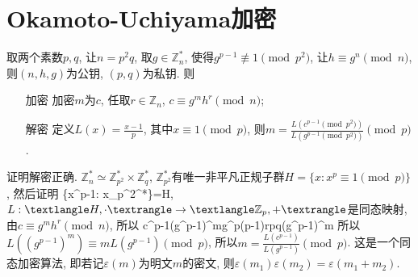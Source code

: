 \section{Okamoto-Uchiyama加密}
取两个素数$p,q$, 让$n=p^2q$, 取$g\in\mathbb{Z}_{n}^{*}$, 使得$g^{p-1}\not\equiv 1\pmod{p^2}$, 让$h\equiv g^n \pmod{n}$, 则$(n,h,g)$为公钥, $(p,q)$为私钥. 则
\begin{itemize}
 \item[加密] 加密$m$为$c$, 任取$r\in\mathbb{Z}_n$, $c\equiv g^mh^r\pmod{n}$;
 \item[解密] 定义$L(x)=\frac{x-1}{p}$, 其中$x\equiv 1\pmod{p}$, 则$m=\frac{L(c^{p-1}\pmod{p^2})}{L(g^{p-1}\pmod{p^2})}\pmod{p}$.
\end{itemize}
\ba
证明解密正确.
$\mathbb{Z}_{n}^{*}\simeq\mathbb{Z}_{p^2}^{*}\times\mathbb{Z}_{q}^{*}$, $\mathbb{Z}_{p^2}^{*}$有唯一非平凡正规子群$H=\{x: x^p\equiv1\pmod{p}\}$, 
然后证明
\bee
\{x^{p-1}: x\in{}_{p^2}^{*}\}=H,
\eee
$L: \textlangle H, \cdot\textrangle\to\textlangle\mathbb{Z}_{p}, +\textrangle$是同态映射, 
由$c\equiv g^mh^r\pmod{n}$, 所以
\bee
c^{p-1}\equiv (g^{p-1})^mg^{p(p-1)rpq}\equiv(g^{p-1})^m
\eee
所以$L((g^{p-1})^m)\equiv mL(g^{p-1})\pmod{p}$, 所以$m=\frac{L(c^{p-1})}{L(g^{p-1})}\pmod{p}$.
\ea
这是一个同态加密算法, 即若记$\varepsilon(m)$为明文$m$的密文, 则$\varepsilon(m_1)\varepsilon(m_2)=\varepsilon(m_1+m_2)$.

